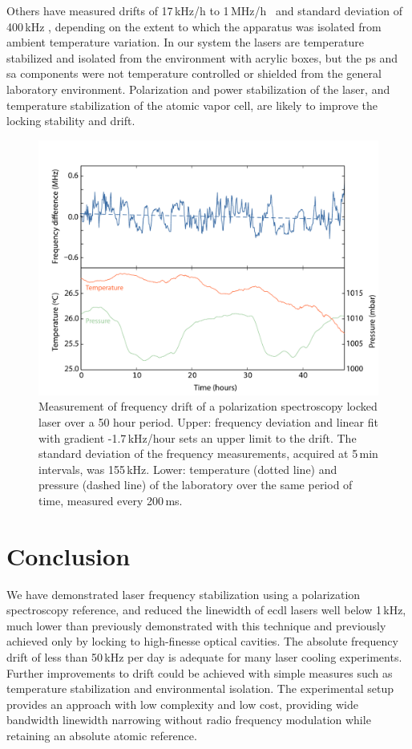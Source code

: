 Others have measured drifts of 17\,kHz/h to 1\,MHz/h~\cite{yoshikawa_frequency_2003, tiwari_laser_2006} and standard deviation of 400\,kHz \cite{lee_frequency_2014}, depending on the extent to which the apparatus was isolated from ambient temperature variation.
In our system the lasers are temperature stabilized and isolated from the environment with acrylic boxes, but the \gls*{ps} and \gls*{sa} components were not temperature controlled or shielded from the general laboratory environment.
Polarization and power stabilization of the laser, and temperature stabilization of the atomic vapor cell, are likely to improve the locking stability and drift.

\begin{figure}[htbp]
\centering
\includegraphics[width=\linewidth]{chapter1/Figs/fig6_v1.pdf}
\caption{Measurement of frequency drift of a polarization spectroscopy locked laser over a 50 hour period.
Upper: frequency deviation and linear fit with gradient -1.7\,kHz/hour sets an upper limit to the drift.
The standard deviation of the frequency measurements, acquired at 5\,min intervals, was 155\,kHz.
Lower: temperature (dotted line) and pressure (dashed line) of the laboratory over the same period of time, measured every 200\,ms.}
\label{drift}
\end{figure}

\section{Conclusion}
We have demonstrated laser frequency stabilization using a polarization spectroscopy reference, and reduced the linewidth of \gls*{ecdl} lasers well below 1\,kHz, much lower than previously demonstrated with this technique and previously achieved only by locking to high-finesse optical cavities.
The absolute frequency drift of less than 50\,kHz per day is adequate for many laser cooling experiments.
Further improvements to drift could be achieved with simple measures such as temperature stabilization and environmental isolation.
The experimental setup provides an approach with low complexity and low cost, providing wide bandwidth linewidth narrowing without radio frequency modulation while retaining an absolute atomic reference.

